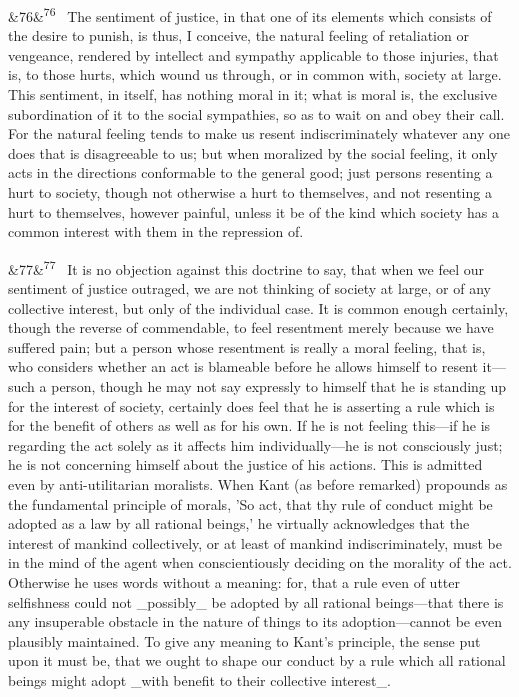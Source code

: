 \documentclass[12pt]{article}
\newcommand{\para}[1][]{\par\noindent\ifx&#1&\else\textsuperscript{\footnotesize #1}~\fi}
\begin{document}
\para[76] The sentiment of justice, in that one of its elements which consists of the desire to punish, is thus, I conceive, the natural feeling of retaliation or vengeance, rendered by intellect and sympathy applicable to those injuries, that is, to those hurts, which wound us through, or in common with, society at large. This sentiment, in itself, has nothing moral in it; what is moral is, the exclusive subordination of it to the social sympathies, so as to wait on and obey their call. For the natural feeling tends to make us resent indiscriminately whatever any one does that is disagreeable to us; but when moralized by the social feeling, it only acts in the directions conformable to the general good; just persons resenting a hurt to society, though not otherwise a hurt to themselves, and not resenting a hurt to themselves, however painful, unless it be of the kind which society has a common interest with them in the repression of.

\para[77] It is no objection against this doctrine to say, that when we feel our sentiment of justice outraged, we are not thinking of society at large, or of any collective interest, but only of the individual case. It is common enough certainly, though the reverse of commendable, to feel resentment merely because we have suffered pain; but a person whose resentment is really a moral feeling, that is, who considers whether an act is blameable before he allows himself to resent it---such a person, though he may not say expressly to himself that he is standing up for the interest of society, certainly does feel that he is asserting a rule which is for the benefit of others as well as for his own. If he is not feeling this---if he is regarding the act solely as it affects him individually---he is not consciously just; he is not concerning himself about the justice of his actions. This is admitted even by anti-utilitarian moralists. When Kant (as before remarked) propounds as the fundamental principle of morals, 'So act, that thy rule of conduct might be adopted as a law by all rational beings,' he virtually acknowledges that the interest of mankind collectively, or at least of mankind indiscriminately, must be in the mind of the agent when conscientiously deciding on the morality of the act. Otherwise he uses words without a meaning: for, that a rule even of utter selfishness could not \_possibly\_ be adopted by all rational beings---that there is any insuperable obstacle in the nature of things to its adoption---cannot be even plausibly maintained. To give any meaning to Kant's principle, the sense put upon it must be, that we ought to shape our conduct by a rule which all rational beings might adopt \_with benefit to their collective interest\_.
\end{document}
